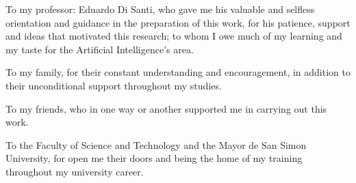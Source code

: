 \documentclass[11pt,spanish,singlespacing,headsepline]{MastersDoctoralThesis}
\begin{document}
\begin{acknowledgements}
\addchaptertocentry{\acknowledgementname} 
\bigskip

To my professor: Eduardo Di Santi, who gave me his valuable and selfless orientation and guidance in the preparation of this work, for his patience, support and ideas that motivated this research; to whom I owe much of my learning and my taste for the Artificial Intelligence's area.

\vspace{5mm} %

To my family, for their constant understanding and encouragement, in addition to their unconditional support throughout my studies.

\vspace{5mm} %

To my friends, who in one way or another supported me in carrying out this work.

\vspace{5mm} %

To the Faculty of Science and Technology and the Mayor de San Simon University, for open me their doors and being the home of my training throughout my university career.

\end{acknowledgements}



\end{document}
